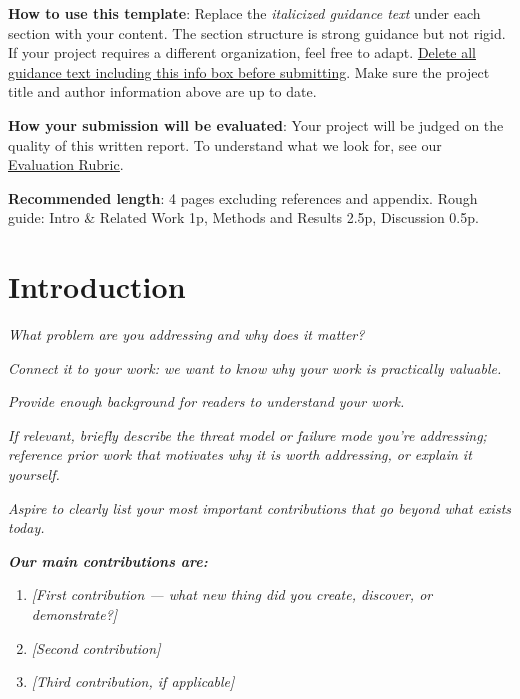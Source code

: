 \documentclass[11pt,letterpaper]{article}
\newcommand{\ulink}[2]{\href{#1}{\underline{#2}}}
\newcommand{\guide}[1]{\textit{#1}}
\begin{document}
\begin{tcolorbox}[colback=black!3,colframe=black!70,boxrule=0.5pt,
                  left=8pt,right=8pt,top=6pt,bottom=6pt]
\textbf{How to use this template}: Replace the \textit{italicized guidance text}
under each section with your content. The section structure is strong guidance
but not rigid. If your project requires a different organization, feel free to
adapt. \underline{Delete all guidance text including this info box before
submitting}. Make sure the project title and author information above are up to
date.

\textbf{How your submission will be evaluated}: Your project will be judged on
the quality of this written report. To understand what we look for, see our
\ulink{https://apartresearch.notion.site/sprint-evaluation-rubric}{Evaluation Rubric}.

\textbf{Recommended length}: 4 pages excluding references and appendix. Rough
guide: Intro \& Related Work 1p, Methods and Results 2.5p, Discussion 0.5p.
\end{tcolorbox}

\section{Introduction}

\guide{What problem are you addressing and why does it matter?}

\guide{Connect it to your work: we want to know why your work is practically
valuable.}

\guide{Provide enough background for readers to understand your work.}

\guide{If relevant, briefly describe the threat model or failure mode you're
addressing; reference prior work that motivates why it is worth addressing, or
explain it yourself.}

\guide{Aspire to clearly list your most important contributions that go beyond
what exists today.}

\textbf{\textit{Our main contributions are:}}
\begin{enumerate}
  \item \guide{[First contribution --- what new thing did you create, discover,
        or demonstrate?]}
  \item \guide{[Second contribution]}
  \item \guide{[Third contribution, if applicable]}
\end{enumerate}
\end{document}
